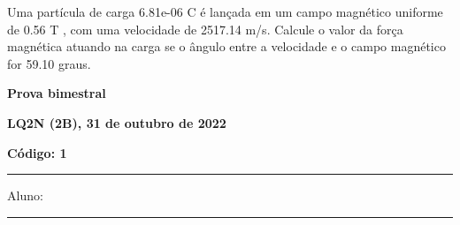 \documentclass[12pt, addpoints]{exam}
\begin{document}
\begin{questions}
\begin{multicols*}{2}
\begin{oneparchoices}
\end{oneparchoices}
\question[20] Uma partícula de carga 6.81e-06 C é lançada em um campo magnético uniforme de    0.56 T , com uma velocidade de 2517.14 m/s. Calcule o valor da força magnética atuando na carga se o ângulo entre a velocidade e o campo magnético for   59.10 graus.

\begin{oneparchoices}
\end{oneparchoices}
\end{multicols*}
\end{questions}
\newpage
        \begin{minipage}[b]{0.75\linewidth}
            \begin{flushleft}
                {\bf \large Prova bimestral}
            \end{flushleft}
            \begin{flushleft}
                {\bf \large LQ2N (2B), 31 de outubro de 2022}
            \end{flushleft}
        \end{minipage}
        \begin{minipage}[b]{0.20\linewidth}
            \begin{flushright}
                {\bf \large Código: 1}
            \end{flushright}
        \end{minipage}
        \vspace{0.5cm} \hrule \vspace{0.5cm}
        \begin{minipage}{0.75\linewidth}
            Aluno:
        \end{minipage}
        \vspace{0.5cm} \hrule \vspace{0.5cm}
\end{document}
